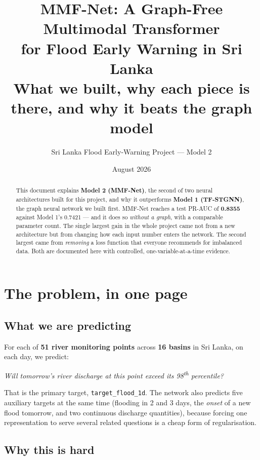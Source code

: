 \documentclass[11pt,a4paper]{article}
\title{\vspace{-1.5cm}\textbf{MMF-Net: A Graph-Free Multimodal Transformer\\for Flood Early Warning in Sri Lanka}\\[0.3cm]
\large What we built, why each piece is there, and why it beats the graph model}
\author{Sri Lanka Flood Early-Warning Project --- Model 2}
\date{August 2026}
\newcommand{\good}[1]{\textcolor{green!45!black}{\textbf{#1}}}
\begin{document}
\maketitle
\thispagestyle{fancy}

\begin{abstract}
\noindent
This document explains \textbf{Model 2 (MMF-Net)}, the second of two neural
architectures built for this project, and why it outperforms \textbf{Model 1
(TF-STGNN)}, the graph neural network we built first. MMF-Net reaches a test
PR-AUC of \good{0.8355} against Model 1's 0.7421 --- and it does so
\emph{without a graph}, with a comparable parameter count. The single largest
gain in the whole project came not from a new architecture but from changing
how each input number enters the network. The second largest came from
\emph{removing} a loss function that everyone recommends for imbalanced data.
Both are documented here with controlled, one-variable-at-a-time evidence.
\end{abstract}

\tableofcontents
\vspace{0.5cm}

\section{The problem, in one page}

\subsection{What we are predicting}

For each of \textbf{51 river monitoring points} across \textbf{16 basins} in Sri
Lanka, on each day, we predict:

\begin{center}
\emph{Will tomorrow's river discharge at this point exceed its
98\textsuperscript{th} percentile?}
\end{center}

That is the primary target, \texttt{target\_flood\_1d}. The network also
predicts five auxiliary targets at the same time (flooding in 2 and 3 days, the
\emph{onset} of a new flood tomorrow, and two continuous discharge quantities),
because forcing one representation to serve several related questions is a
cheap form of regularisation.

\subsection{Why this is hard}
\end{document}
